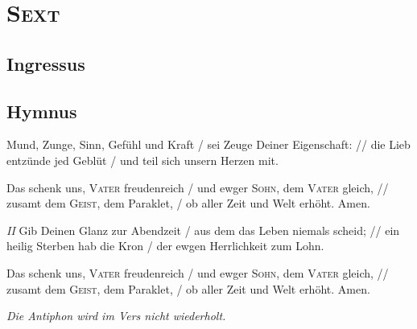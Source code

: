 \chapter[Sext]{\textsc{Sext}}
\def\gebet{\textsc{Sext}}
\section*{Ingressus}
\par
{}
\newpage
\section*{Hymnus}
\begin{multicols}{2}\setlength{\columnseprule}{0.2pt}
Mund, Zunge, Sinn, Gefühl und Kraft / sei Zeuge Deiner Eigenschaft: // die Lieb entzünde jed Geblüt / und teil sich unsern Herzen mit.\par
 \columnbreak\emph{\Abar} Das schenk uns, \textsc{Vater} freudenreich / und ewger \textsc{Sohn}, dem \textsc{Vater} gleich, // zusamt dem \textsc{Geist}, dem Paraklet, / ob aller Zeit und Welt erhöht. Amen.\par
\end{multicols}
\begin{multicols}{2}\setlength{\columnseprule}{0.2pt} \emph{II} Gib Deinen Glanz zur Abendzeit / aus dem das Leben niemals scheid; // ein heilig Sterben hab die Kron / der ewgen Herrlichkeit zum Lohn.\par
 \columnbreak\emph{\Abar} Das schenk uns, \textsc{Vater} freudenreich / und ewger \textsc{Sohn}, dem \textsc{Vater} gleich, // zusamt dem \textsc{Geist}, dem Paraklet, / ob aller Zeit und Welt erhöht. Amen.\par
\end{multicols}\newpage
{}
\textit{Die Antiphon wird im Vers nicht wiederholt.}\par
{}
